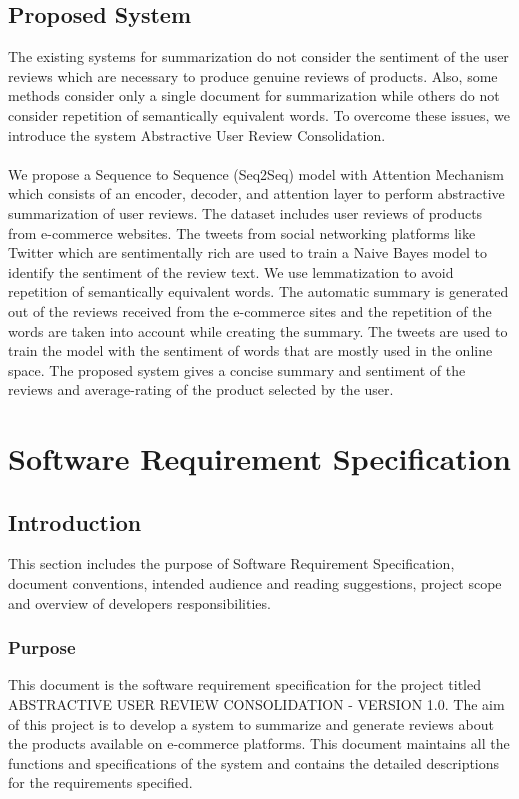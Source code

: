 \documentclass[11pt]{report}
\begin{document}
\section{Proposed System}
The existing systems for summarization do not consider the sentiment of the user reviews which are necessary to produce genuine reviews of products. Also, some methods consider only a single document for summarization while others do not consider repetition of semantically equivalent words. To overcome these issues, we introduce the system Abstractive User Review Consolidation.\\
\\
We propose a Sequence to Sequence (Seq2Seq) model with Attention Mechanism which consists of an encoder, decoder, and attention layer to perform abstractive summarization of user reviews. The dataset includes user reviews of products from e-commerce websites. The tweets from social networking platforms like Twitter which are sentimentally rich are used to train a Naive Bayes model to identify the sentiment of the review text. We use lemmatization to avoid repetition of semantically equivalent words. The automatic summary is generated out of the reviews received from the e-commerce sites and the repetition of the words are taken into account while creating the summary. The tweets are used to train the model with the sentiment of words that are mostly used in the online space. The proposed system gives a concise summary and sentiment of the reviews and average-rating of the product selected by the user.

\chapter{Software Requirement Specification}
\section{Introduction}
This section includes the purpose of Software Requirement Specification, document conventions, intended audience and reading suggestions, project scope and overview of developers responsibilities.

 \subsection{Purpose}
 This document is the software requirement specification for the project titled ABSTRACTIVE USER REVIEW CONSOLIDATION - VERSION 1.0. The aim of this project is to develop a system to summarize and generate reviews about the products available on e-commerce platforms. This document maintains all the functions and specifications of the system and contains the detailed descriptions for the requirements specified.
 
\end{document}
